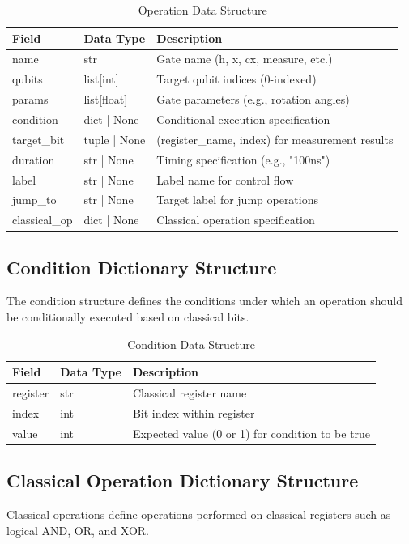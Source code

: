 \begin{table}[H]
\centering
\caption{Operation Data Structure}
\begin{tabular}{|p{3cm}|p{2.5cm}|p{7cm}|}
\hline
\textbf{Field} & \textbf{Data Type} & \textbf{Description} \\
\hline
name & str & Gate name (h, x, cx, measure, etc.) \\
\hline
qubits & list[int] & Target qubit indices (0-indexed) \\
\hline
params & list[float] & Gate parameters (e.g., rotation angles) \\
\hline
condition & dict | None & Conditional execution specification \\
\hline
target\_bit & tuple | None & (register\_name, index) for measurement results \\
\hline
duration & str | None & Timing specification (e.g., "100ns") \\
\hline
label & str | None & Label name for control flow \\
\hline
jump\_to & str | None & Target label for jump operations \\
\hline
classical\_op & dict | None & Classical operation specification \\
\hline
\end{tabular}
\end{table}

\subsection{Condition Dictionary Structure}
The condition structure defines the conditions under which an operation should be conditionally executed based on classical bits.

\begin{table}[H]
\centering
\caption{Condition Data Structure}
\begin{tabular}{|p{3cm}|p{2.5cm}|p{7cm}|}
\hline
\textbf{Field} & \textbf{Data Type} & \textbf{Description} \\
\hline
register & str & Classical register name \\
\hline
index & int & Bit index within register \\
\hline
value & int & Expected value (0 or 1) for condition to be true \\
\hline
\end{tabular}
\end{table}

\subsection{Classical Operation Dictionary Structure}
Classical operations define operations performed on classical registers such as logical AND, OR, and XOR.

